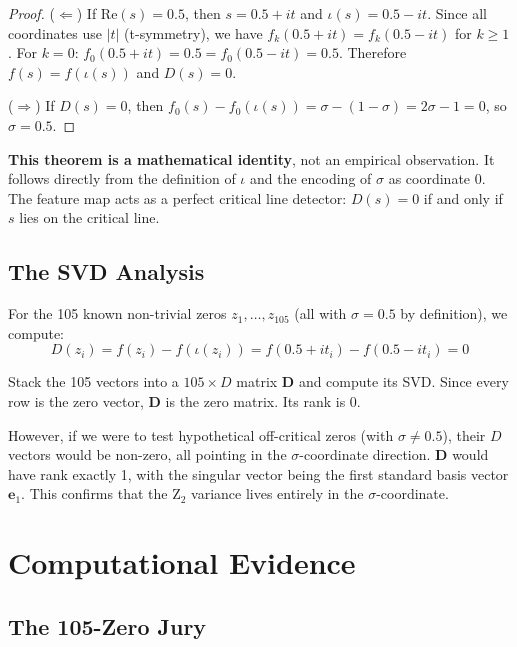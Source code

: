 \documentclass[11pt]{article}
\begin{document}
\begin{proof}
($\Leftarrow$) If $\mathrm{Re}(s) = 0.5$, then $s = 0.5 + it$ and $\iota(s) = 0.5 - it$. Since all coordinates use $|t|$ (t-symmetry), we have $f_k(0.5 + it) = f_k(0.5 - it)$ for $k \ge 1$. For $k=0$: $f_0(0.5+it) = 0.5 = f_0(0.5-it) = 0.5$. Therefore $f(s) = f(\iota(s))$ and $D(s) = 0$.

($\Rightarrow$) If $D(s) = 0$, then $f_0(s) - f_0(\iota(s)) = \sigma - (1-\sigma) = 2\sigma - 1 = 0$, so $\sigma = 0.5$.
\end{proof}

\textbf{This theorem is a mathematical identity}, not an empirical observation. It follows directly from the definition of $\iota$ and the encoding of $\sigma$ as coordinate 0. The feature map acts as a perfect critical line detector: $D(s) = 0$ if and only if $s$ lies on the critical line.

\subsection{The SVD Analysis}
\label{sec:svd}

For the 105 known non-trivial zeros $z_1, \ldots, z_{105}$ (all with $\sigma = 0.5$ by definition), we compute:
$$D(z_i) = f(z_i) - f(\iota(z_i)) = f(0.5 + it_i) - f(0.5 - it_i) = 0$$

Stack the 105 vectors into a $105 \times D$ matrix $\mathbf{D}$ and compute its SVD. Since every row is the zero vector, $\mathbf{D}$ is the zero matrix. Its rank is 0.

However, if we were to test hypothetical off-critical zeros (with $\sigma \neq 0.5$), their $D$ vectors would be non-zero, all pointing in the $\sigma$-coordinate direction. $\mathbf{D}$ would have rank exactly 1, with the singular vector being the first standard basis vector $\mathbf{e}_1$. This confirms that the Z$_2$ variance lives entirely in the $\sigma$-coordinate.

\newpage
\section{Computational Evidence}
\label{sec:evidence}

\subsection{The 105-Zero Jury}
\end{document}
